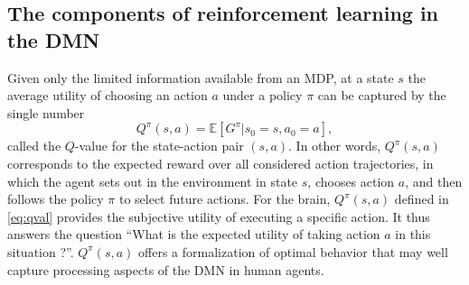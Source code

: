 \documentclass[10pt,letterpaper]{article}
\def\V{\mathbf{V}}
\begin{document}
\subsection{The components of reinforcement learning in the DMN}
Given only the limited information available from an MDP, at a state $s$ the average
utility of choosing an action $a$ under a policy $\pi$ can be captured by the single number
\begin{equation}
  \label{eq:qval}
  Q^{\pi}(s,a) = \mathbb E [G^\pi|s_0=s,a_0=a],
\end{equation}
called the $Q$-value for the state-action pair $(s,a)$.
In other words, $Q^{\pi}(s,a)$ corresponds to the expected reward
over all considered action trajectories, in which
the agent sets out in the environment in state
$s$, chooses action $a$, and then follows the policy $\pi$ to select future actions.
For the brain,
$Q^{\pi}(s, a)$ defined in \eqref{eq:qval} provides the subjective
utility of executing a specific action.
It thus answers the question
``What is the expected utility of taking action $a$ in this situation ?''.
$Q^{\pi}(s,a)$ offers a formalization of optimal behavior that
may well capture processing aspects of the DMN in human agents.



\end{document}
